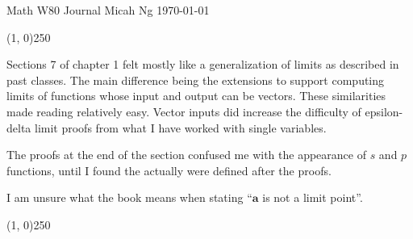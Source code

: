 \documentclass[11pt,letterpaper]{article}
\begin{document}
\noindent
Math W80 Journal \hfill Micah Ng \hfill \today

\begin{center}
\line(1, 0){250}
\end{center}

Sections 7 of chapter 1 felt mostly like a generalization of limits as
described in past classes. The main difference being the extensions to support
computing limits of functions whose input and output can be vectors. These
similarities made reading relatively easy. Vector inputs did increase the
difficulty of epsilon-delta limit proofs from what I have worked with single
variables.

The proofs at the end of the section confused me with the appearance of $s$ and
$p$ functions, until I found the actually were defined after the proofs.

I am unsure what the book means when stating ``$\mathbf{a}$ is not a limit
point''.

\begin{center}
\line(1, 0){250}
\end{center}
\end{document}
